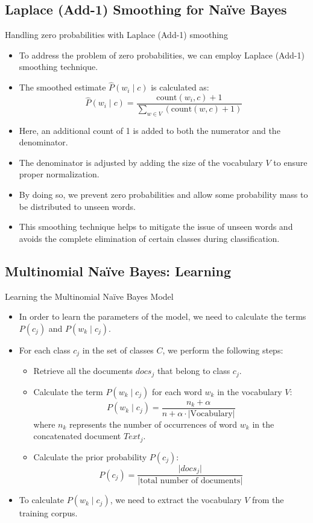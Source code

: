 \documentclass{book}
\begin{document}
\subsection{Laplace (Add-1) Smoothing for Naïve Bayes}
Handling zero probabilities with Laplace (Add-1) smoothing
\begin{itemize}
    \item To address the problem of zero probabilities, we can employ Laplace (Add-1) smoothing technique.
    \item The smoothed estimate $\hat{P}(w_i \mid c)$ is calculated as:
    \[
    \hat{P}(w_i \mid c) = \frac{\text{count}(w_i, c) + 1}{\sum_{w \in V} (\text{count}(w, c) + 1)}
    \]
    \item Here, an additional count of 1 is added to both the numerator and the denominator.
    \item The denominator is adjusted by adding the size of the vocabulary $V$ to ensure proper normalization.
    \item By doing so, we prevent zero probabilities and allow some probability mass to be distributed to unseen words.
    \item This smoothing technique helps to mitigate the issue of unseen words and avoids the complete elimination of certain classes during classification.
\end{itemize}






\subsection{Multinomial Naïve Bayes: Learning}
Learning the Multinomial Naïve Bayes Model
\begin{itemize}
    \item In order to learn the parameters of the model, we need to calculate the terms $P(c_j)$ and $P(w_k \mid c_j)$.
    \item For each class $c_j$ in the set of classes $C$, we perform the following steps:
    \begin{itemize}
        \item Retrieve all the documents $docs_j$ that belong to class $c_j$.
        \item Calculate the term $P(w_k \mid c_j)$ for each word $w_k$ in the vocabulary $V$:
        \[
        P(w_k \mid c_j) = \frac{{n_k + \alpha}}{{n + \alpha \cdot \lvert \text{Vocabulary} \rvert}}
        \]
        where $n_k$ represents the number of occurrences of word $w_k$ in the concatenated document $Text_j$.
        \item Calculate the prior probability $P(c_j)$:
        \[
        P(c_j) = \frac{{\lvert docs_j \rvert}}{{\lvert \text{total number of documents} \rvert}}
        \]
    \end{itemize}
    \item To calculate $P(w_k \mid c_j)$, we need to extract the vocabulary $V$ from the training corpus.
\end{itemize}
\end{document}
